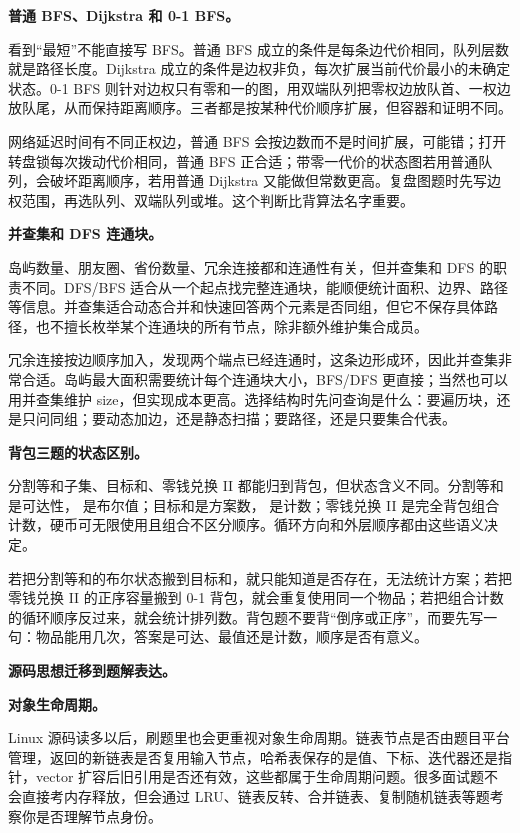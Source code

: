 \noindent\textbf{普通 BFS、Dijkstra 和 0-1 BFS。}

看到“最短”不能直接写 BFS。普通 BFS 成立的条件是每条边代价相同，队列层数就是路径长度。Dijkstra 成立的条件是边权非负，每次扩展当前代价最小的未确定状态。0-1 BFS 则针对边权只有零和一的图，用双端队列把零权边放队首、一权边放队尾，从而保持距离顺序。三者都是按某种代价顺序扩展，但容器和证明不同。

网络延迟时间有不同正权边，普通 BFS 会按边数而不是时间扩展，可能错；打开转盘锁每次拨动代价相同，普通 BFS 正合适；带零一代价的状态图若用普通队列，会破坏距离顺序，若用普通 Dijkstra 又能做但常数更高。复盘图题时先写边权范围，再选队列、双端队列或堆。这个判断比背算法名字重要。

\noindent\textbf{并查集和 DFS 连通块。}

岛屿数量、朋友圈、省份数量、冗余连接都和连通性有关，但并查集和 DFS 的职责不同。DFS/BFS 适合从一个起点找完整连通块，能顺便统计面积、边界、路径等信息。并查集适合动态合并和快速回答两个元素是否同组，但它不保存具体路径，也不擅长枚举某个连通块的所有节点，除非额外维护集合成员。

冗余连接按边顺序加入，发现两个端点已经连通时，这条边形成环，因此并查集非常合适。岛屿最大面积需要统计每个连通块大小，BFS/DFS 更直接；当然也可以用并查集维护 size，但实现成本更高。选择结构时先问查询是什么：要遍历块，还是只问同组；要动态加边，还是静态扫描；要路径，还是只要集合代表。

\noindent\textbf{背包三题的状态区别。}

分割等和子集、目标和、零钱兑换 II 都能归到背包，但状态含义不同。分割等和是可达性， 是布尔值；目标和是方案数， 是计数；零钱兑换 II 是完全背包组合计数，硬币可无限使用且组合不区分顺序。循环方向和外层顺序都由这些语义决定。

若把分割等和的布尔状态搬到目标和，就只能知道是否存在，无法统计方案；若把零钱兑换 II 的正序容量搬到 0-1 背包，就会重复使用同一个物品；若把组合计数的循环顺序反过来，就会统计排列数。背包题不要背“倒序或正序”，而要先写一句：物品能用几次，答案是可达、最值还是计数，顺序是否有意义。

\noindent\textbf{源码思想迁移到题解表达。}

\noindent\textbf{对象生命周期。}

Linux 源码读多以后，刷题里也会更重视对象生命周期。链表节点是否由题目平台管理，返回的新链表是否复用输入节点，哈希表保存的是值、下标、迭代器还是指针，vector 扩容后旧引用是否还有效，这些都属于生命周期问题。很多面试题不会直接考内存释放，但会通过 LRU、链表反转、合并链表、复制随机链表等题考察你是否理解节点身份。

